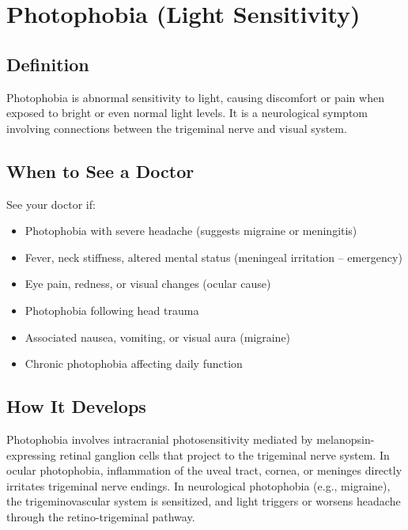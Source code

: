 \chapter{Photophobia (Light Sensitivity)}

\section*{Definition}
Photophobia is abnormal sensitivity to light, causing discomfort or pain when exposed to bright or even normal light levels. It is a neurological symptom involving connections between the trigeminal nerve and visual system.

\section*{When to See a Doctor}
See your doctor if:
\begin{itemize}
  \item Photophobia with severe headache (suggests migraine or meningitis)
  \item Fever, neck stiffness, altered mental status (meningeal irritation -- emergency)
  \item Eye pain, redness, or visual changes (ocular cause)
  \item Photophobia following head trauma
  \item Associated nausea, vomiting, or visual aura (migraine)
  \item Chronic photophobia affecting daily function
\end{itemize}

\section*{How It Develops}
Photophobia involves intracranial photosensitivity mediated by melanopsin-expressing retinal ganglion cells that project to the trigeminal nerve system. In ocular photophobia, inflammation of the uveal tract, cornea, or meninges directly irritates trigeminal nerve endings. In neurological photophobia (e.g., migraine), the trigeminovascular system is sensitized, and light triggers or worsens headache through the retino-trigeminal pathway.


